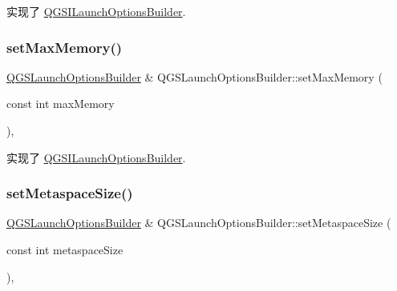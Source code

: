 实现了 \mbox{\hyperlink{class_q_g_s_i_launch_options_builder_ac5f8f2487f876513c06c2ebb134607aa}{Q\+G\+S\+I\+Launch\+Options\+Builder}}.

\mbox{\label{class_q_g_s_launch_options_builder_adc04a84e5ad29c2a815577a28d3a3479}} 
\subsubsection{\texorpdfstring{set\+Max\+Memory()}{setMaxMemory()}}
{\footnotesize\ttfamily \mbox{\hyperlink{class_q_g_s_launch_options_builder}{Q\+G\+S\+Launch\+Options\+Builder}} \& Q\+G\+S\+Launch\+Options\+Builder\+::set\+Max\+Memory (\begin{DoxyParamCaption}\item[{const int}]{max\+Memory }\end{DoxyParamCaption})\hspace{0.3cm}{\ttfamily [override]}, {\ttfamily [virtual]}}



实现了 \mbox{\hyperlink{class_q_g_s_i_launch_options_builder_a58390571b351c5bc06ba9f2fad8079bc}{Q\+G\+S\+I\+Launch\+Options\+Builder}}.

\mbox{\label{class_q_g_s_launch_options_builder_a4c09c32f28b985ae9e47e1aab5f27b22}} 
\subsubsection{\texorpdfstring{set\+Metaspace\+Size()}{setMetaspaceSize()}}
{\footnotesize\ttfamily \mbox{\hyperlink{class_q_g_s_launch_options_builder}{Q\+G\+S\+Launch\+Options\+Builder}} \& Q\+G\+S\+Launch\+Options\+Builder\+::set\+Metaspace\+Size (\begin{DoxyParamCaption}\item[{const int}]{metaspace\+Size }\end{DoxyParamCaption})\hspace{0.3cm}{\ttfamily [override]}, {\ttfamily [virtual]}}



